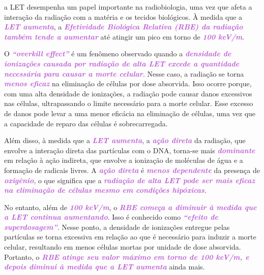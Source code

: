 \documentclass[11pt,a4paper]{article}
\begin{document}
	a LET desempenha um papel importante na radiobiologia, uma vez que afeta a interação da radiação com a matéria e os tecidos biológicos. À medida que a \textcolor{MediumOrchid}{\textbf{\textit{LET aumenta}}}, a \textcolor{MediumOrchid}{\textbf{\textit{Efetividade Biológica Relativa (RBE) da radiação também tende a aumentar}}} até atingir um pico em torno de \textcolor{MediumOrchid}{\textbf{\textit{100 keV/\mu m}}}.

	O \textcolor{MediumOrchid}{\textbf{\textit{``overkill effect''}}} é um fenômeno observado quando a \textcolor{MediumOrchid}{\textbf{\textit{densidade de ionizações causada por radiação de alta LET excede a quantidade necessária para causar a morte celular}}}. Nesse caso, a radiação se torna \textcolor{MediumOrchid}{\textbf{\textit{menos eficaz}}} na eliminação de células por dose absorvida. Isso ocorre porque, com uma alta densidade de ionizações, a radiação pode causar danos excessivos nas células, ultrapassando o limite necessário para a morte celular. Esse excesso de danos pode levar a uma menor eficácia na eliminação de células, uma vez que a capacidade de reparo das células é sobrecarregada. 

	Além disso, à medida que a \textcolor{MediumOrchid}{\textbf{\textit{LET aumenta}}}, a \textcolor{MediumOrchid}{\textbf{\textit{ação direta}}} da radiação, que envolve a interação direta das partículas com o DNA, torna-se mais \textcolor{MediumOrchid}{\textbf{\textit{dominante}}} em relação à ação indireta, que envolve a ionização de moléculas de água e a formação de radicais livres. A \textcolor{MediumOrchid}{\textbf{\textit{ação direta}}} é \textcolor{MediumOrchid}{\textbf{\textit{menos dependente}}} da presença de \textcolor{MediumOrchid}{\textbf{\textit{oxigênio}}}, o que significa que a \textcolor{MediumOrchid}{\textbf{\textit{radiação de alta LET pode ser mais eficaz na eliminação de células mesmo em condições hipóxicas}}}.

	No entanto, além de \textcolor{MediumOrchid}{\textbf{\textit{100 keV/\mu m}}}, o \textcolor{MediumOrchid}{\textbf{\textit{RBE começa a diminuir à medida que a LET continua aumentando}}}. Isso é conhecido como \textcolor{MediumOrchid}{\textbf{\textit{``efeito de superdosagem''}}}. Nesse ponto, a densidade de ionizações entregue pelas partículas se torna excessiva em relação ao que é necessário para induzir a morte celular, resultando em menos células mortas por unidade de dose absorvida. Portanto, o \textcolor{MediumOrchid}{\textbf{\textit{RBE atinge seu valor máximo em torno de 100 keV/\mu m, e depois diminui à medida que a LET aumenta}}} ainda mais.
\end{document}
